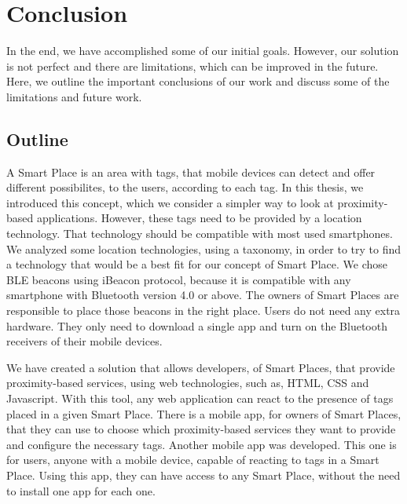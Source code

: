 
\chapter{Conclusion}
\label{chapter:conclusion}
In the end, we have accomplished some of our initial goals.
However, our solution is not perfect and there are limitations, which can be improved in the future.
Here, we outline the important conclusions of our work and discuss some of the limitations and future work.

\section{Outline}
\label{sec:conclusion_outline}
A Smart Place is an area with tags, that mobile devices can detect and offer different possibilites, to the users, according to each tag.
In this thesis, we introduced this concept, which we consider a simpler way to look at proximity-based applications.
However, these tags need to be provided by a location technology.
That technology should be compatible with most used smartphones.
We analyzed some location technologies, using a taxonomy\cite{location}, in order to try to find a technology that would be a best fit for our concept of Smart Place.
We chose \gls{BLE} beacons using iBeacon protocol, because it is compatible with any smartphone with Bluetooth version 4.0 or above.
The owners of Smart Places are responsible to place those beacons in the right place.
Users do not need any extra hardware.
They only need to download a single app and turn on the Bluetooth receivers of their mobile devices.

We have created a solution that allows developers, of Smart Places, that provide proximity-based services, using web technologies, such as, \gls{HTML}, \gls{CSS} and Javascript.
With this tool, any web application can react to the presence of tags placed in a given Smart Place.
There is a mobile app, for owners of Smart Places, that they can use to choose which proximity-based services they want to provide and configure the necessary tags.
Another mobile app was developed.
This one is for users, anyone with a mobile device, capable of reacting to tags in a Smart Place.
Using this app, they can have access to any Smart Place, without the need to install one app for each one.

